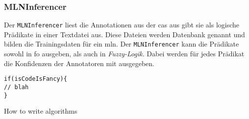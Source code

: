 \subsubsection{MLNInferencer}
Der \texttt{MLNInferencer} liest die Annotationen aus der \gls{cas} aus gibt sie als logische Prädikate in einer Textdatei aus. Diese Dateien werden Datenbank genannt und bilden die Trainingsdaten für ein \gls{mln}. Der \texttt{MLNInferencer} kann die Prädikate sowohl in \gls{fo} ausgeben, als auch in \textit{Fuzzy-Logik}. Dabei werden für jedes Prädikat die Konfidenzen der Annotatoren mit ausgegeben.

\begin{algorithm}[H]
\begin{lstlisting}
if(isCodeIsFancy){
// blah
}
\end{lstlisting}
 \caption{How to write algorithms}
\end{algorithm}
